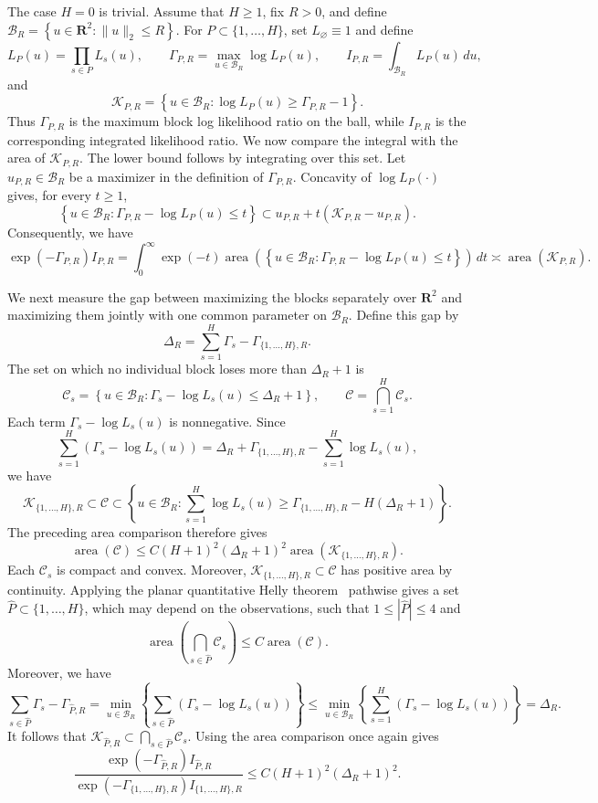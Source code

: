 \documentclass[11pt, letterpaper, hidelinks]{article}
\makeatletter
\renewcommand{\proofname}{\textit{\textbf{Proof}}}
\renewenvironment{proof}[1][\proofname]{\par\pushQED{\qed}\normalfont \topsep6\p@\@plus6\p@\relax\trivlist\item[\hskip\labelsep#1\@addpunct{}]\ignorespaces}{\popQED\endtrivlist\@endpefalse}
\newcommand{\proofsketchname}{\textit{\textbf{Proof sketch}}}
\newenvironment{proofsketch}
  {\begin{proof}[\proofsketchname]}
  {\end{proof}}
\newcommand{\R}{\mathbf R}
\newcommand{\1}{\mathbf 1}
\let\subseteq\subset
\renewcommand{\leq}{\leqslant}
\renewcommand{\geq}{\geqslant}
\theoremstyle{plain}
\theoremstyle{definition}
\makeatother
\begin{document}
\begin{proofsketch}
The case $H=0$ is trivial.  Assume that $H\geq1$, fix $R>0$, and define
$
\mathcal B_R=\left\{u\in\R^2:\|u\|_2\leq R\right\}.
$
For $P\subseteq\{1,\ldots,H\}$, set $L_\varnothing\equiv1$ and define
\[
L_P(u)=\prod_{s\in P}L_s(u),
\qquad
\Gamma_{P,R}=\max_{u\in\mathcal B_R}\log L_P(u),
\qquad
I_{P,R}=\int_{\mathcal B_R}L_P(u)\,du,
\]
and
\[
\mathcal K_{P,R}
=\left\{u\in\mathcal B_R:\log L_P(u)\geq\Gamma_{P,R}-1\right\}.
\]
Thus $\Gamma_{P,R}$ is the maximum block log likelihood ratio on the ball,
while $I_{P,R}$ is the corresponding integrated likelihood ratio.  We now
compare the integral with the area of $\mathcal K_{P,R}$.  The lower bound
follows by integrating over this set.  Let $u_{P,R}\in\mathcal B_R$ be a
maximizer in the definition of $\Gamma_{P,R}$.  Concavity of $\log L_P(\cdot)$
gives, for every $t\geq1$,
\[
\left\{u\in\mathcal B_R:
\Gamma_{P,R}-\log L_P(u)\leq t\right\}
\subseteq
u_{P,R}+t\left(\mathcal K_{P,R}-u_{P,R}\right).
\]
Consequently, we have
\[
\exp(-\Gamma_{P,R})I_{P,R}
=\int_0^\infty \exp(-t)
\operatorname{area}\left(\left\{u\in\mathcal B_R:
\Gamma_{P,R}-\log L_P(u)\leq t\right\}\right)\,dt \asymp\operatorname{area}(\mathcal K_{P,R}).
\]

We next measure the gap between maximizing the blocks separately over $\R^2$
and maximizing them jointly with one common parameter on $\mathcal B_R$.  Define this gap by
\[
\Delta_R=\sum_{s=1}^H\Gamma_s-\Gamma_{\{1,\ldots,H\},R}.
\]
The set on which no individual block
loses more than $\Delta_R+1$ is
\[
\mathcal C_s
=\left\{u\in\mathcal B_R:
\Gamma_s-\log L_s(u)\leq\Delta_R+1\right\},
\qquad
\mathcal C=\bigcap_{s=1}^H\mathcal C_s.
\]
Each term $\Gamma_s-\log L_s(u)$ is nonnegative.  Since
\[
\sum_{s=1}^H\left(\Gamma_s-\log L_s(u)\right)
=\Delta_R+\Gamma_{\{1,\ldots,H\},R}
-\sum_{s=1}^H\log L_s(u),
\]
we have
\[
\mathcal K_{\{1,\ldots,H\},R}\subseteq\mathcal C
\subseteq
\left\{u\in\mathcal B_R:
\sum_{s=1}^H\log L_s(u)
\geq\Gamma_{\{1,\ldots,H\},R}-H(\Delta_R+1)\right\}.
\]
The preceding area comparison therefore gives
\[
\operatorname{area}(\mathcal C)
\leq C(H+1)^2(\Delta_R+1)^2
\operatorname{area}(\mathcal K_{\{1,\ldots,H\},R}).
\]
Each $\mathcal C_s$ is compact and convex.  Moreover,
$\mathcal K_{\{1,\ldots,H\},R}\subseteq\mathcal C$ has positive area by
continuity.  Applying the planar quantitative Helly
theorem~\cite{BaranyKatchalskiPach1982} pathwise
gives a set
$\widehat P\subseteq\{1,\ldots,H\}$, which may depend on the observations,
such that $1\leq|\widehat P|\leq4$ and
\[
\operatorname{area}\left(\bigcap_{s\in\widehat P}\mathcal C_s\right)
\leq C\operatorname{area}(\mathcal C).
\]
Moreover, we have
\[
\sum_{s\in\widehat P}\Gamma_s-\Gamma_{\widehat P,R}
=\min_{u\in\mathcal B_R}\left\{
\sum_{s\in\widehat P}\left(\Gamma_s-\log L_s(u)\right)\right\}
\leq\min_{u\in\mathcal B_R}\left\{
\sum_{s=1}^H\left(\Gamma_s-\log L_s(u)\right)\right\}
=\Delta_R.
\]
It follows that
$\mathcal K_{\widehat P,R}\subseteq\bigcap_{s\in\widehat P}\mathcal C_s$.
Using the area comparison once again gives
\[
\frac{\exp(-\Gamma_{\widehat P,R})I_{\widehat P,R}}
{\exp(-\Gamma_{\{1,\ldots,H\},R})I_{\{1,\ldots,H\},R}}
\leq C(H+1)^2(\Delta_R+1)^2.
\]


\end{proofsketch}
\end{document}
